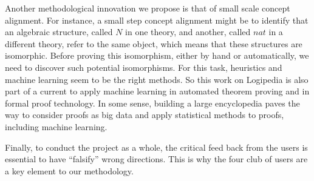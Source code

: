 Another methodological innovation we propose is that of small scale
concept alignment. For instance, a small step concept alignment might
be to identify that an algebraic structure, called $N$ in one theory,
and another, called $nat$ in a different theory, refer to the same
object, which means that these structures are isomorphic. Before
proving this isomorphism, either by hand or automatically, we need to
discover such potential isomorphisms. For this task, heuristics and
machine learning seem to be the right methods. So this work on
Logipedia is also part of a current to apply machine learning in
automated theorem proving and in formal proof technology. In some
sense, building a large encyclopedia paves the way to consider proofs
as big data and apply statistical methods to proofs, including machine
learning.

Finally, to conduct the project as a whole, the critical feed back
from the users is essential to have ``falsify'' wrong directions. This
is why the four club of users are a key element to our methodology.

